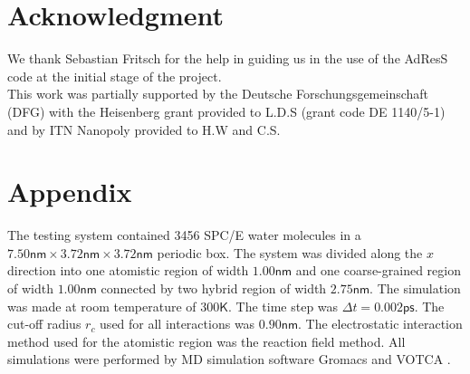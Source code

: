 \documentclass[aps,prb,preprint,citeautoscript]{revtex4}
\begin{document}
\section{Acknowledgment}
We thank Sebastian Fritsch for the help in guiding us in the use of the AdResS code at the initial stage of the project.\\ 
This work was partially supported by the Deutsche Forschungsgemeinschaft (DFG) with the Heisenberg grant provided to L.D.S (grant code DE 1140/5-1) and by ITN Nanopoly provided to H.W and C.S.

\section{Appendix}
The testing system contained 3456 SPC/E \cite{berendsen1987missing}
water molecules in a $7.50\textsf{nm}\times 3.72\textsf{nm}\times
3.72\textsf{nm}$ periodic box. The system was divided along the $x$ direction
into one atomistic region of width $1.00\textsf{nm}$ and one
coarse-grained region of width $1.00\textsf{nm}$ connected by two
hybrid region of width $2.75\textsf{nm}$. The simulation was made at
room temperature of $300\textsf{K}$. The time step was $\Delta t =
0.002\textsf{ps}$. The cut-off radius $r_{c}$ used for all interactions was
$0.90\textsf{nm}$. The electrostatic interaction method used for the
atomistic region was the reaction field method. All simulations were
performed by MD simulation software Gromacs \cite{gromacs}
and VOTCA \cite{ruehle2009versatile}.




% 
% 
\end{document}
